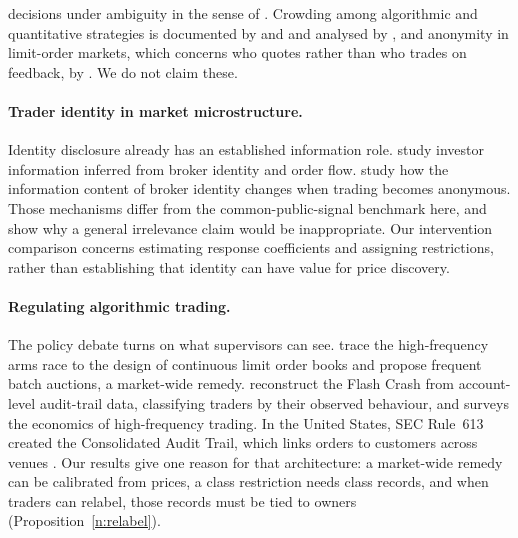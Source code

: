 \documentclass[12pt]{article}
\theoremstyle{definition}
\theoremstyle{remark}
\begin{document}
decisions under ambiguity in the sense of \citet{manski2000}. Crowding among algorithmic and quantitative strategies is documented by \citet{chaboud2014} and \citet{khandani2011} and analysed by \citet{stein2009}, and anonymity in limit-order markets, which concerns who quotes rather than who trades on feedback, by \citet{foucault2007}. We do not claim these.

\paragraph{Trader identity in market microstructure.} Identity disclosure already has an established information role. \citet{linnainmaa2012} study investor information inferred from broker identity and order flow. \citet{frino2010} study how the information content of broker identity changes when trading becomes anonymous. Those mechanisms differ from the common-public-signal benchmark here, and show why a general irrelevance claim would be inappropriate. Our intervention comparison concerns estimating response coefficients and assigning restrictions, rather than establishing that identity can have value for price discovery.

\paragraph{Regulating algorithmic trading.} The policy debate turns on what supervisors can see. \citet{budish2015} trace the high-frequency arms race to the design of continuous limit order books and propose frequent batch auctions, a market-wide remedy. \citet{kirilenko2017} reconstruct the Flash Crash from account-level audit-trail data, classifying traders by their observed behaviour, and \citet{menkveld2016} surveys the economics of high-frequency trading. In the United States, SEC Rule~613 created the Consolidated Audit Trail, which links orders to customers across venues \citep{sec2012cat}. Our results give one reason for that architecture: a market-wide remedy can be calibrated from prices, a class restriction needs class records, and when traders can relabel, those records must be tied to owners (Proposition~\ref{n:relabel}).
\end{document}
